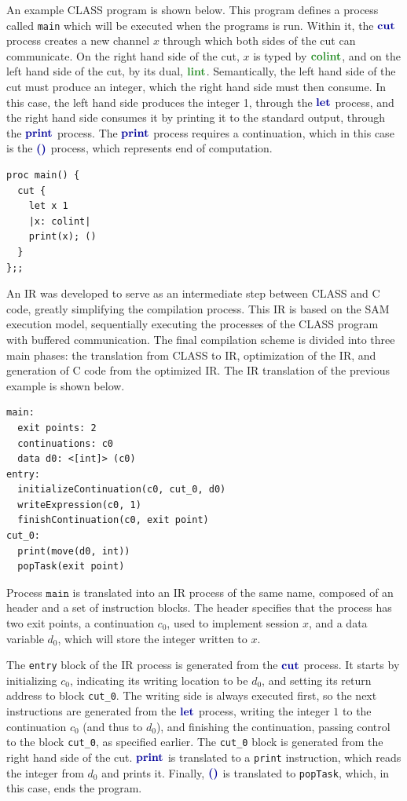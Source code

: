 \documentclass[sigconf,nonacm,natbib=true]{acmart}
\begin{document}
An example \ac{CLASS} program is shown below. This program defines a process called \texttt{main} which will be executed when the programs is run. Within it, the $\cutp$ process creates a new channel $x$ through which both sides of the cut can communicate. On the right hand side of the cut, $x$ is typed by $\colintt$, and on the left hand side of the cut, by its dual, $\lintt$. Semantically, the left hand side of the cut must produce an integer, which the right hand side must then consume. In this case, the left hand side produces the integer 1, through the $\letp$ process, and the right hand side consumes it by printing it to the standard output, through the $\printp$ process. The $\printp$ process requires a continuation, which in this case is the $\emptyp$ process, which represents end of computation.


\begin{lstlisting}[language=CLASS]
proc main() {
  cut {
    let x 1
    |x: colint|
    print(x); ()
  }
};;
\end{lstlisting}

An \acf{IR} was developed to serve as an intermediate step between \ac{CLASS} and C code, greatly simplifying the compilation process. This \ac{IR} is based on the \ac{SAM} execution model, sequentially executing the processes of the \ac{CLASS} program with buffered communication. The final compilation scheme is divided into three main phases: the translation from \ac{CLASS} to \ac{IR}, optimization of the \ac{IR}, and generation of C code from the optimized \ac{IR}. The \ac{IR} translation of the previous example is shown below.

\begin{lstlisting}[language=IR]
main:
  exit points: 2
  continuations: c0
  data d0: <[int]> (c0)
entry:
  initializeContinuation(c0, cut_0, d0)
  writeExpression(c0, 1)
  finishContinuation(c0, exit point)
cut_0:
  print(move(d0, int))
  popTask(exit point)
\end{lstlisting}

Process $\texttt{main}$ is translated into an \ac{IR} process of the same name, composed of an header and a set of instruction blocks. The header specifies that the process has two exit points, a continuation $c_0$, used to implement session $x$, and a data variable $d_0$, which will store the integer written to $x$.

The \texttt{entry} block of the \ac{IR} process is generated from the $\cutp$ process. It starts by initializing $c_0$, indicating its writing location to be $d_0$, and setting its return address to block \texttt{cut\_0}. The writing side is always executed first, so the next instructions are generated from the $\letp$ process, writing the integer $1$ to the continuation $c_0$ (and thus to $d_0$), and finishing the continuation, passing control to the block \texttt{cut\_0}, as specified earlier. The \texttt{cut\_0} block is generated from the right hand side of the cut. $\printp$ is translated to a \texttt{print} instruction, which reads the integer from $d_0$ and prints it. Finally, $\emptyp$ is translated to \texttt{popTask}, which, in this case, ends the program.
\end{document}
